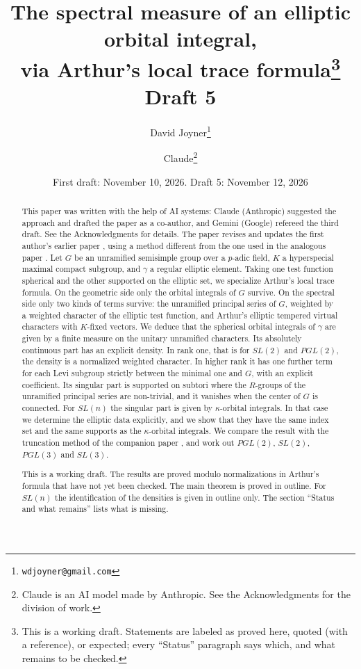 \documentclass[12pt,letterpaper]{article}
\title{The spectral measure of an elliptic orbital integral,\\ via Arthur's local trace formula\thanks{This is a working draft. Statements are labeled as proved here, quoted (with a reference), or expected; every ``Status'' paragraph says which, and what remains to be checked.}\\[1ex]
\large Draft 5}
\author{David Joyner\thanks{\texttt{wdjoyner@gmail.com}} \and
Claude\thanks{Claude is an AI model made by Anthropic. See the Acknowledgments for the division of work.}}
\date{First draft: November 10, 2026. Draft 5: November 12, 2026}
\numberwithin{equation}{section}
\theoremstyle{plain}
\theoremstyle{definition}
\theoremstyle{remark}
\begin{document}
\maketitle

\begin{abstract}
This paper was written with the help of AI systems: Claude (Anthropic) suggested the approach and drafted the paper as a co-author, and Gemini (Google) refereed the third draft. See the Acknowledgments for details. The paper revises and updates the first author's earlier paper \cite{Jo92}, using a method different from the one used in the analogous paper \cite{JC26}. Let $G$ be an unramified semisimple group over a $p$-adic field, $K$ a hyperspecial maximal compact subgroup, and $\gamma$ a regular elliptic element. Taking one test function spherical and the other supported on the elliptic set, we specialize Arthur's local trace formula. On the geometric side only the orbital integrals of $G$ survive. On the spectral side only two kinds of terms survive: the unramified principal series of $G$, weighted by a weighted character of the elliptic test function, and Arthur's elliptic tempered virtual characters with $K$-fixed vectors. We deduce that the spherical orbital integrals of $\gamma$ are given by a finite measure on the unitary unramified characters. Its absolutely continuous part has an explicit density. In rank one, that is for $SL(2)$ and $PGL(2)$, the density is a normalized weighted character. In higher rank it has one further term for each Levi subgroup strictly between the minimal one and $G$, with an explicit coefficient. Its singular part is supported on subtori where the $R$-groups of the unramified principal series are non-trivial, and it vanishes when the center of $G$ is connected. For $SL(n)$ the singular part is given by $\kappa$-orbital integrals. In that case we determine the elliptic data explicitly, and we show that they have the same index set and the same supports as the $\kappa$-orbital integrals. We compare the result with the truncation method of the companion paper \cite{JC26}, and work out $PGL(2)$, $SL(2)$, $PGL(3)$ and $SL(3)$.

This is a working draft. The results are proved modulo normalizations in Arthur's formula that have not yet been checked. The main theorem is proved in outline. For $SL(n)$ the identification of the densities is given in outline only. The section ``Status and what remains'' lists what is missing.
\end{abstract}

\tableofcontents
\end{document}
